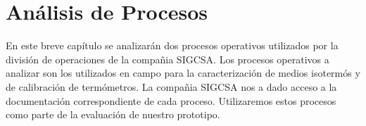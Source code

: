 \chapter{Análisis de Procesos}

\par 
En este breve capítulo se analizarán dos procesos operativos utilizados por la división de operaciones de la compañia SIGCSA. Los procesos operativos a analizar son los utilizados en campo para la caracterización de medios isotermós y de calibración de termómetros. La compañia SIGCSA nos a dado acceso a la documentación correspondiente de cada proceso. Utilizaremos estos procesos como parte de la evaluación de nuestro prototipo.




	